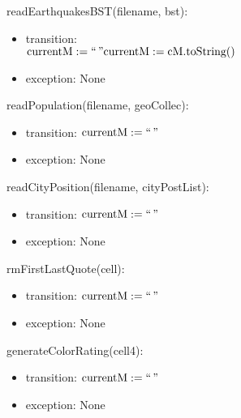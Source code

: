 \documentclass[12pt]{article}
\begin{document}
\noindent readEarthquakesBST(filename, bst):
\begin{itemize}
\item transition: \\ $\mbox{currentM} := ` ` \,  " \\
\mbox{currentM} := \mbox{cM.toString()}$
\item exception: None
\end{itemize}

\noindent readPopulation(filename, geoCollec):
\begin{itemize}
\item transition: $\mbox{currentM} := ` ` \,  "$
\item exception: None
\end{itemize}

\noindent readCityPosition(filename, cityPostList):
\begin{itemize}
\item transition: $\mbox{currentM} := ` ` \,  "$
\item exception: None
\end{itemize}

\noindent rmFirstLastQuote(cell):
\begin{itemize}
\item transition: $\mbox{currentM} := ` ` \,  "$
\item exception: None
\end{itemize}

\noindent generateColorRating(cell4):
\begin{itemize}
\item transition: $\mbox{currentM} := ` ` \,  "$
\item exception: None
\end{itemize}
\end{document}
